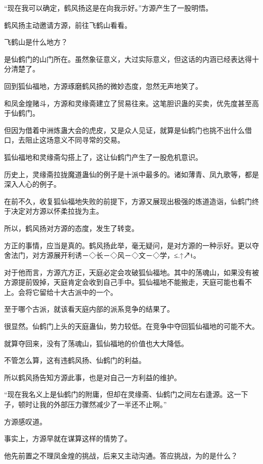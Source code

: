
\begin{this_body}

“现在我可以确定，鹤风扬这是在向我示好。”方源产生了一股明悟。

鹤风扬主动邀请方源，前往飞鹤山看看。

飞鹤山是什么地方？

是仙鹤门的山门所在。虽然象征意义，大过实际意义，但这话的内涵已经表达得十分清楚了。

回到狐仙福地，方源琢磨鹤风扬的微妙态度，忽然无声地笑了。

和凤金煌赌斗，方源和灵缘斋建立了贸易往来。这笔胆识蛊的买卖，优先度甚至高于仙鹤门。

但因为借着中洲炼蛊大会的虎皮，又是众人见证，就算是仙鹤门也挑不出什么借口，去阻止这场意义不同寻常的交易。

狐仙福地和灵缘斋勾搭上了，这让仙鹤门产生了一股危机意识。

历史上，灵缘斋拉拢魔道蛊仙的例子是十派中最多的。诸如薄青、凤九歌等，都是深入人心的例子。

在前不久，收复狐仙福地失败的前提下，方源又展现出极强的炼道造诣，仙鹤门终于决定对方源以怀柔拉拢为主。

所以，鹤风扬对方源的态度，发生了转变。

方正的事情，应当是真的。鹤风扬此举，毫无疑问，是对方源的一种示好。更以夺舍法门，对方源展开利诱－◇长－◇风－◇文－◇学，≤.↑↗t。

对于他而言，方源亢方正，天庭必定会攻破狐仙福地。其中的荡魂山，如果没有被方源提前毁掉，天庭肯定会收到自己手中。狐仙福地不能搬走，天庭可能也看不上。会将它留给十大古派中的一个。

至于哪个古派，就该看天庭内部的派系竞争的结果了。

很显然。仙鹤门上头的天庭蛊仙，势力较低。在竞争中夺回狐仙福地的可能不大。

就算夺回来，没有了荡魂山，狐仙福地的价值也大大降低。

不管怎么算，这有违鹤风扬、仙鹤门的利益。

所以鹤风扬告知方源此事，也是对自己一方利益的维护。

“现在我名义上是仙鹤门的附庸，但却在灵缘斋、仙鹤门之间左右逢源。这一下子，顿时让我的外部压力骤然减少了一半还不止啊。”

方源感叹道。

事实上，方源早就在谋算这样的情势了。

他先前置之不理凤金煌的挑战，后来又主动沟通。答应挑战，为的是什么？


\end{this_body}

